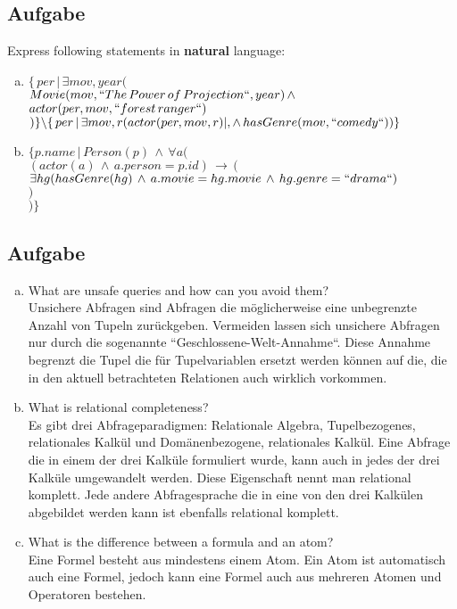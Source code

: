 \documentclass[11pt,a4paper,DIV=9]{scrartcl}
\newcounter{temp}
\newcommand{\aufgabe}[1]{
  \setcounter{temp}{\value{subsection}}
  \setcounter{subsection}{#1}
  \addtocounter{subsection}{-1}
  \subsection{Aufgabe}
  \setcounter{subsection}{\value{temp}}
}
\begin{document}
\aufgabe{2}
Express following statements in \textbf{natural} language:
 \begin{enumerate}[a)]
   \item 
   $ 
   \{\, per \, | \, \exists mov, year ( 
   $ 
   \\ 
   $
   Movie(mov, ``The \, Power \, of \, Projection``, year) \,  \wedge \, 
   $ 
   \\ 
   $
   actor(per,mov, ``forest \, ranger``) 
   $ 
   \\ 
   $
   ) \} \backslash \{ \,per \, | \, \exists mov, r(actor(per, mov, r) |, \wedge \, hasGenre(mov, ``comedy``))\}
   $
   \item 
   $
   \{p.name \, | \, Person(p) \, \wedge \, \forall a( 
   $
   \\ 
   $ 
   (actor(a) \, \wedge \, a.person=p.id) \, \rightarrow \, ( 
   $
   \\
   $
   \exists hg(hasGenre(hg) \, \wedge \, a.movie=hg.movie \, \wedge \, hg.genre=``drama``)
   $
   \\
   $ 
   )
   $
   \\
   $
   ) \}
   $
 \end{enumerate}
\aufgabe{3}
\begin{enumerate}[a)]
 \item What are unsafe queries and how can you avoid them? \\
 Unsichere Abfragen sind Abfragen die m\"oglicherweise eine unbegrenzte Anzahl von Tupeln zur\"uckgeben. Vermeiden lassen sich unsichere Abfragen nur durch die sogenannte ``Geschlossene-Welt-Annahme``. Diese Annahme begrenzt die Tupel die f\"ur Tupelvariablen ersetzt werden k\"onnen auf die, die in den aktuell betrachteten Relationen auch wirklich vorkommen.
 \item What is relational completeness? \\
 Es gibt drei Abfrageparadigmen: Relationale Algebra, Tupelbezogenes, relationales Kalk\"ul und Dom\"anenbezogene, relationales Kalk\"ul. Eine Abfrage die in einem der drei Kalk\"ule formuliert wurde, kann auch in jedes der drei Kalk\"ule umgewandelt werden. Diese Eigenschaft nennt man relational komplett. Jede andere Abfragesprache die in eine von den drei Kalk\"ulen abgebildet werden kann ist ebenfalls relational komplett.
 \item What is the difference between a formula and an atom? \\
 Eine Formel besteht aus mindestens einem Atom. Ein Atom ist automatisch auch eine Formel, jedoch kann eine Formel auch aus mehreren Atomen und Operatoren bestehen.
\end{enumerate}
\end{document}
